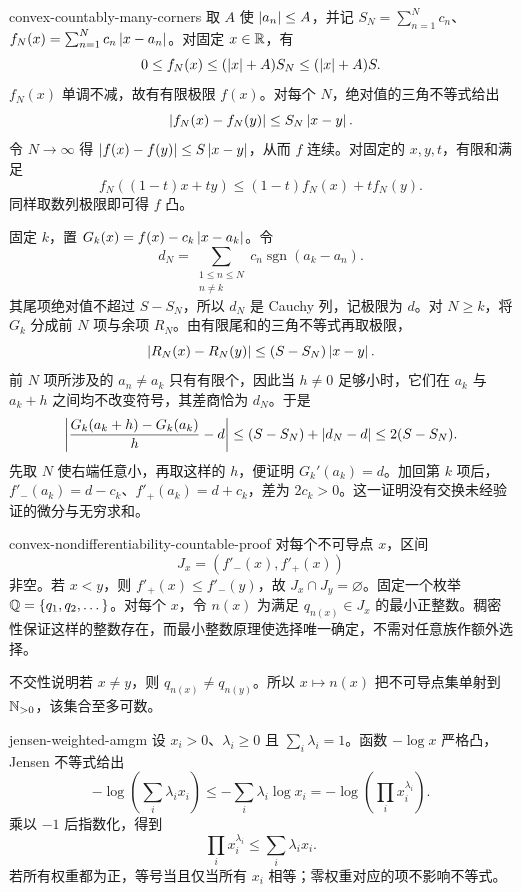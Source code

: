 \begin{solution}{convex-countably-many-corners}
取 \(A\) 使 \(\left|a_n\right|\le A\)，并记 \(S_N=\sum_{n=1}^N c_n\)、\(f_N(x)=\sum_{n=1}^N c_n\left|x-a_n\right|\)。对固定 \(x\in\mathbb{R}\)，有
\[
 0\le f_N(x)\le (\left|x\right|+A)S_N\le(\left|x\right|+A)S.
\]
\(f_N(x)\) 单调不减，故有有限极限 \(f(x)\)。对每个 \(N\)，绝对值的三角不等式给出
\[
 \left|f_N(x)-f_N(y)\right|\le S_N\left|x-y\right|.
\]
令 \(N\to\infty\) 得 \(\left|f(x)-f(y)\right|\le S\left|x-y\right|\)，从而 \(f\) 连续。对固定的 \(x,y,t\)，有限和满足
\[
 f_N((1-t)x+ty)\le(1-t)f_N(x)+tf_N(y).
\]
同样取数列极限即可得 \(f\) 凸。

固定 \(k\)，置 \(G_k(x)=f(x)-c_k\left|x-a_k\right|\)。令
\[
 d_N=\sum_{\substack{1\le n\le N\\n\ne k}}c_n\operatorname{sgn}(a_k-a_n).
\]
其尾项绝对值不超过 \(S-S_N\)，所以 \(d_N\) 是 Cauchy 列，记极限为 \(d\)。对 \(N\ge k\)，将 \(G_k\) 分成前 \(N\) 项与余项 \(R_N\)。由有限尾和的三角不等式再取极限，
\[
 \left|R_N(x)-R_N(y)\right|\le(S-S_N)\left|x-y\right|.
\]
前 \(N\) 项所涉及的 \(a_n\ne a_k\) 只有有限个，因此当 \(h\ne0\) 足够小时，它们在 \(a_k\) 与 \(a_k+h\) 之间均不改变符号，其差商恰为 \(d_N\)。于是
\[
 \left|\frac{G_k(a_k+h)-G_k(a_k)}h-d\right|
 \le(S-S_N)+\left|d_N-d\right|\le2(S-S_N).
\]
先取 \(N\) 使右端任意小，再取这样的 \(h\)，便证明 \(G_k'(a_k)=d\)。加回第 \(k\) 项后，\(f'_-(a_k)=d-c_k\)、\(f'_+(a_k)=d+c_k\)，差为 \(2c_k>0\)。这一证明没有交换未经验证的微分与无穷求和。
\end{solution}

\begin{solution}{convex-nondifferentiability-countable-proof}
对每个不可导点 \(x\)，区间
\[
 J_x=(f'_-(x),f'_+(x))
\]
非空。若 \(x<y\)，则 \(f'_+(x)\le f'_-(y)\)，故 \(J_x\cap J_y=\varnothing\)。固定一个枚举 \(\mathbb{Q}=\{q_1,q_2,\dots\}\)。对每个 \(x\)，令 \(n(x)\) 为满足 \(q_{n(x)}\in J_x\) 的最小正整数。稠密性保证这样的整数存在，而最小整数原理使选择唯一确定，不需对任意族作额外选择。

不交性说明若 \(x\ne y\)，则 \(q_{n(x)}\ne q_{n(y)}\)。所以 \(x\mapsto n(x)\) 把不可导点集单射到 \(\mathbb{N}_{>0}\)，该集合至多可数。
\end{solution}

\begin{solution}{jensen-weighted-amgm}
设 \(x_i>0\)、\(\lambda_i\ge0\) 且 \(\sum_i\lambda_i=1\)。函数 \(-\log x\) 严格凸，Jensen 不等式给出
\[
 -\log\!\left(\sum_i\lambda_i x_i\right)
 \le-\sum_i\lambda_i\log x_i
 =-\log\!\left(\prod_i x_i^{\lambda_i}\right).
\]
乘以 \(-1\) 后指数化，得到
\[
 \prod_i x_i^{\lambda_i}\le\sum_i\lambda_i x_i.
\]
若所有权重都为正，等号当且仅当所有 \(x_i\) 相等；零权重对应的项不影响不等式。
\end{solution}

